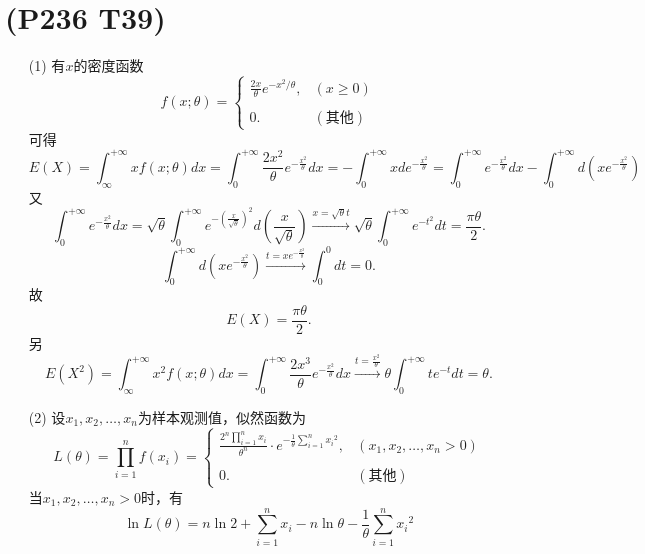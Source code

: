 \documentclass{article}
\begin{document}
\section{(P236 T39)}  %
\begin{enumerate}
    \item [(1)]
    有$x$的密度函数
    \[
        f(x;\theta) =
        \begin{cases}
            \displaystyle{\frac{2x}{\theta}} e^{- x^2 /\theta}, & (x\geq 0)\\
            \\
            0. & (\mbox{其他})
        \end{cases}
    \]
    可得
    \[
        E(X)
        = \int_{\infty}^{+\infty} x f(x;\theta) dx 
        = \int_{0}^{+\infty} \frac{2 x^2}{\theta} e^{-\frac{x^2}{\theta}} dx
        = - \int_{0}^{+\infty} x d e^{-\frac{x^2}{\theta}}
        = \int_{0}^{+\infty} e^{-\frac{x^2}{\theta}} dx - \int_{0}^{+\infty} d \left(x e^{-\frac{x^2}{\theta}}\right)
    \]
    又
    \[
        \int_{0}^{+\infty} e^{-\frac{x^2}{\theta}} dx 
        = \sqrt{\theta} \int_{0}^{+\infty} e^{-{\left(\frac{x}{\sqrt{\theta}}\right)}^2} d\left(\frac{x}{\sqrt{\theta}}\right)
        \xrightarrow{x=\sqrt{\theta}t} \sqrt{\theta} \int_{0}^{+\infty} e^{-t^2} dt 
        = \frac{\pi \theta}{2} .
    \]
    \[
        \int_{0}^{+\infty} d \left(x e^{-\frac{x^2}{\theta}}\right)
        \xrightarrow{t = x e^{-\frac{x^2}{\theta}}} \int_{0}^{0} dt 
        = 0.
    \]
    故
    \[
        E(X) = \frac{\pi \theta}{2}.    
    \]
    另
    \[
        E(X^2)
        = \int_{\infty}^{+\infty} x^2 f(x;\theta) dx 
        = \int_{0}^{+\infty} \frac{2 x^3}{\theta} e^{-\frac{x^2}{\theta}} dx
        \xrightarrow{t = \frac{x^2}{\theta}} \theta \int_{0}^{+\infty} t e^{-t} dt 
        = \theta .   
    \]
    \item [(2)]设$x_1, x_2, \ldots, x_n$为样本观测值，似然函数为
    \[
        L(\theta)
        = \prod_{i=1}^{n} f(x_i)
        = 
        \begin{cases}
            \displaystyle{\frac{2^n \prod\limits_{i=1}^{n} x_i }{\theta^n}} \cdot e^{{-\frac{1}{\theta} \sum\limits_{i=1}^{n} {x_i}^2} }, & (x_1, x_2, \ldots, x_n >0)\\
            \\
            0. & (\mbox{其他})
        \end{cases}    
    \]
    当$x_1, x_2, \ldots, x_n > 0$时，有
    \[
        \ln L(\theta)
        = n \ln 2 + \sum\limits_{i=1}^{n} x_i - n\ln \theta  - \frac{1}{\theta} \sum\limits_{i=1}^{n} {x_i}^2   
\]
\end{enumerate}
\end{document}
